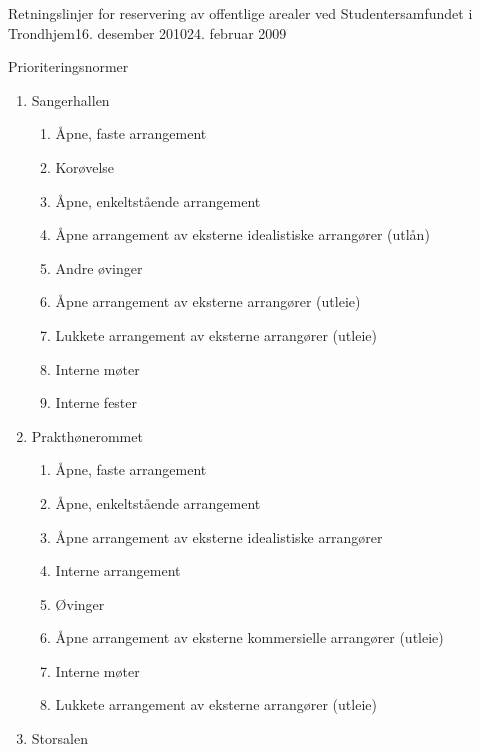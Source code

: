 \begin{instruks}{Retningslinjer for reservering av offentlige arealer
    ved Studentersamfundet i Trondhjem}{16. desember 2010}{24. februar 2009}
\begin{instruksledd}{Prioriteringsnormer}
\begin{enumerate}
\begin{enumerate}
\begin{enumerate}
                            \item Lukkete arrangementer av eksterne arrangører (utleie)
                            \item Interne fester
                        \end{enumerate}
                    \item Sangerhallen
                        \begin{enumerate}
                            \item  Åpne, faste arrangement
                            \item Korøvelse
                            \item  Åpne, enkeltstående arrangement
                            \item Åpne arrangement av eksterne idealistiske arrangører (utlån)
                            \item Andre øvinger
                            \item Åpne arrangement av eksterne arrangører (utleie)
                            \item Lukkete arrangement av eksterne arrangører (utleie)
                            \item Interne møter
                            \item Interne fester
                        \end{enumerate}
                    \item Prakthønerommet
                        \begin{enumerate}
                            \item Åpne, faste arrangement
                            \item Åpne, enkeltstående arrangement
                            \item Åpne arrangement av eksterne idealistiske arrangører
                            \item Interne arrangement
                            \item Øvinger
                            \item Åpne arrangement av eksterne kommersielle arrangører (utleie)
                            \item Interne møter
                            \item Lukkete arrangement av eksterne arrangører (utleie)
                        \end{enumerate}
                    \item Storsalen

\end{enumerate}
\end{enumerate}
\end{instruksledd}
\end{instruks}
